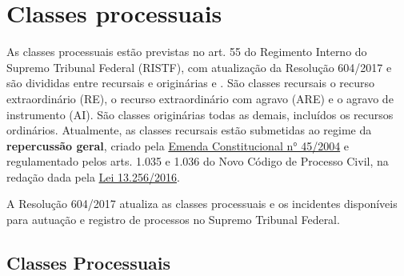 \documentclass[
]{book}
\begin{document}
\hypertarget{classes-processuais}{%
\section{Classes processuais}\label{classes-processuais}}

As classes processuais estão previstas no art. 55 do Regimento Interno do Supremo Tribunal Federal (RISTF), com atualização da Resolução 604/2017 e são divididas entre recursais e originárias e . São classes recursais o recurso extraordinário (RE), o recurso extraordinário com agravo (ARE) e o agravo de instrumento (AI). São classes originárias todas as demais, incluídos os recursos ordinários. Atualmente, as classes recursais estão submetidas ao regime da \textbf{repercussão geral}, criado pela \href{http://www.planalto.gov.br/ccivil_03/Constituicao/Emendas/Emc/emc45.htm\#art9}{Emenda Constitucional n° 45/2004} e regulamentado pelos arts. 1.035 e 1.036 do Novo Código de Processo Civil, na redação dada pela \href{http://www.planalto.gov.br/ccivil_03/_Ato2015-2018/2016/Lei/L13256.htm\#art3}{Lei 13.256/2016}.

A Resolução 604/2017 atualiza as classes processuais e os incidentes disponíveis para autuação e registro de processos no Supremo Tribunal Federal.

\hypertarget{classes-processuais-1}{%
\subsection{Classes Processuais}\label{classes-processuais-1}}
\end{document}
